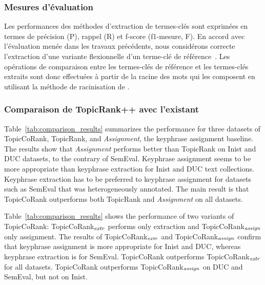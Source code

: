       
      \subsubsection{Mesures d'évaluation}
      \label{subsubsec:main-automatic_keyphrase_annotation-supervised_automatic_keyphrase_annotation-evaluation-evaluation_measures}
        Les performances des méthodes d'extraction de termes-clés sont exprimées
        en termes de précision (P), rappel (R) et f-score (f1-mesure, F). En
        accord avec l'évaluation menée dans les travaux précédents, nous
        considérons correcte l'extraction d'une variante flexionnelle d'un
        terme-clé de référence~\cite{kim2010semeval}. Les opérations de
        comparaison entre les termes-clés de référence et les termes-clés
        extraits sont donc effectuées à partir de la racine des mots qui les
        composent en utilisant la méthode de racinisation de
        .
      
      \subsubsection{Comparaison de TopicRank++ avec l'existant}
      \label{subsubsec:main-automatic_keyphrase_annotation-supervised_automatic_keyphrase_annotation-evaluation-comparison}
        Table~\ref{tab:comparison_results} summarizes the performance for three datasets of TopicCoRank,  TopicRank, and \textit{Assignment}, the keyphrase assignment baseline.
        The results show that \textit{Assignment} performs better than TopicRank on Inist and DUC datasets, to the contrary of
        SemEval. 
        Keyphrase assignment seems to be more appropriate than keyphrase extraction for Inist and DUC text collections.
        Keyphrase extraction has to be preferred to keyphrase assignment for datasets such as SemEval that was heterogeneously annotated. 
        The main result is that TopicCoRank outperforms both TopicRank and \textit{Assignment} on all
        datasets. 
        
        Table~\ref{tab:comparison_results} shows the performance of two variants of TopicCoRank: TopicCoRank$_\textnormal{\textit{extr}}$ performs only  extraction
        and  TopicCoRank$_\textnormal{\textit{assign}}$ only assignment.
        The results of TopicCoRank$_\textnormal{\textit{extr}}$ and 
        TopicCoRank$_\textnormal{\textit{assign}}$ confirm that keyphrase assignment is more appropriate for 
        Inist and DUC, whereas keyphrase extraction is for SemEval.
        TopicCoRank outperforms TopicCoRank$_\textnormal{\textit{extr}}$ for all datasets.
        TopicCoRank outperforms TopicCoRank$_\textnormal{\textit{assign}}$ on DUC and SemEval, but not on Inist.
        
